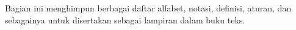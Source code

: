\documentclass[../../include/open-logic-part]{subfiles}
\begin{document}

\begin{editorial}
  Bagian ini menghimpun berbagai daftar alfabet, notasi,
  definisi, aturan, dan sebagainya untuk disertakan sebagai lampiran dalam buku teks.
\end{editorial}



\OLEndPartHook
\end{document}
